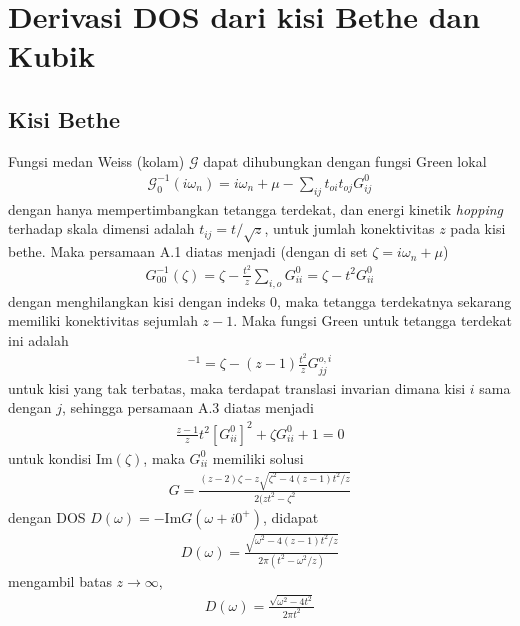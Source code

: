 \chapter{Derivasi DOS dari kisi Bethe dan Kubik}

\section{Kisi Bethe}
Fungsi medan Weiss (kolam) $\mathcal{G}$ dapat dihubungkan dengan fungsi Green lokal\cite{DMFT}
\begin{align}
\mathcal{G}_0^{-1}(i\omega_n) = i\omega_n + \mu - \sum_{ij} t_{oi} t_{oj} G_{ij}^0
\end{align}
dengan hanya mempertimbangkan tetangga terdekat, dan energi kinetik \textit{hopping} terhadap skala dimensi adalah $t_{ij} = t / \sqrt{z}$, untuk jumlah konektivitas $z$ pada kisi bethe. Maka persamaan A.1 diatas menjadi (dengan di set $\zeta = i\omega_n + \mu$)
\begin{align}
G_{00}^{-1}(\zeta) = \zeta - \frac{t^2}{z}\sum_{i,o} G_{ii}^0 = \zeta - t^2G_{ii}^0
\end{align}
dengan menghilangkan kisi dengan indeks $0$, maka tetangga terdekatnya sekarang memiliki konektivitas sejumlah $z-1$. Maka fungsi Green untuk tetangga terdekat ini adalah
\begin{align}
[G^0_{ii}]^{-1} = \zeta - (z - 1)\frac{t^2}{z}G_{jj}^{o,i}
\end{align}
untuk kisi yang tak terbatas, maka terdapat translasi invarian dimana kisi $i$ sama dengan $j$, sehingga persamaan A.3 diatas menjadi
\begin{align}
\frac{z-1}{z}t^2[G^0_{ii}]^2 + \zeta G^0_{ii} + 1 = 0
\end{align}
untuk kondisi $\text{Im}(\zeta)$, maka $G^0_{ii}$ memiliki solusi
\begin{align}
G = \frac{(z-2)\zeta - z\sqrt{\zeta^2 - 4(z-1)t^2/z}}{2(z t^2 - \zeta^2}
\end{align}
dengan DOS $D(\omega) = -\text{Im} G(\omega + i0^+)$, didapat
\begin{align}
D(\omega) = \frac{\sqrt{\omega^2 - 4(z-1)t^2/z}}{2\pi (t^2 - \omega^2 /z)}
\end{align}
mengambil batas $z \rightarrow \infty$,
\begin{align}
D(\omega) = \frac{\sqrt{\omega^2 - 4t^2}}{2\pi t^2}
\end{align}

